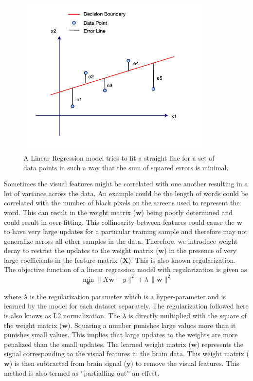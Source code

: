 \begin{figure}[h]
\centering
\includegraphics[width=10cm, height=8cm]{Figures/LinearRegression}
\caption{ A Linear Regression model tries to fit a straight line for a set of data points in such a way that the sum of squared errors is minimal.}
\label{LinearRegression}
\end{figure}

Sometimes the visual features might be correlated with one another resulting in a lot of variance across the data. An example could be the length of words could be correlated with the number of black pixels on the screens used to represent the word. This can result in the weight matrix ($\mathbf w$) being poorly  determined and could result in over-fitting. This collinearity between features could cause the $\mathbf w$ to have very large updates for a particular training sample and therefore may not generalize across all other samples in the data. Therefore, we introduce weight decay to restrict the updates to the weight matrix ($\mathbf w$) in the presence of very large coefficients in the feature matrix ($\mathbf X$). This is also known regularization. The objective function of a linear regression model with regularization is given as %
\[\min\limits_{\mathbf w} \| X \mathbf w - y \|^2 + \lambda \, \| \mathbf w \|^2\]

where $\lambda$ is the regularization parameter which is a hyper-parameter and is learned by the model for each dataset separately. The regularization followed here is also knows as L2 normalization. The $\lambda$ is directly multiplied with the square of the weight matrix ($\mathbf w$). Squaring a number punishes large values more than it punishes small values. This implies that large updates to the weights are more penalized than the small updates. The learned weight matrix ($\mathbf w$) represents the signal corresponding to the visual features in the brain data. This weight matrix ($\mathbf w$) is then subtracted from brain signal ($\mathbf y$) to remove the visual features. This method is also termed as ”partialling out” an effect.

